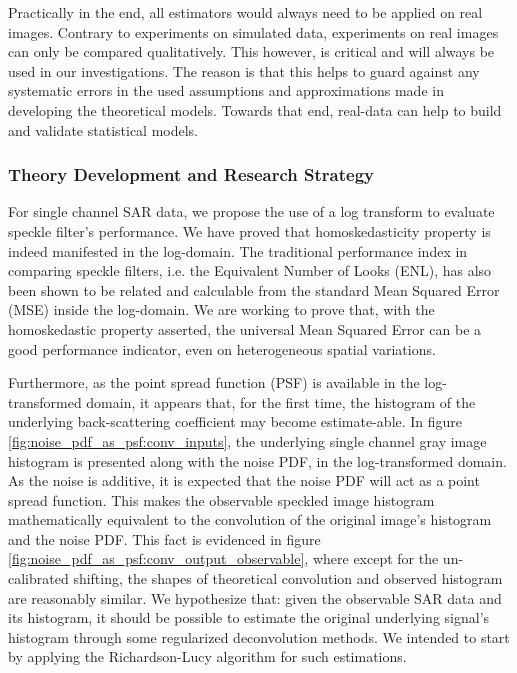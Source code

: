 Practically in the end, all estimators would always need to be applied on real images.
Contrary to experiments on simulated data, experiments on real images can only be compared qualitatively.
This however, is critical and will always be used in our investigations.
The reason is that this helps to guard against any systematic errors in the used assumptions and approximations made in developing the theoretical models.
Towards that end, real-data can help to build and validate statistical models.

\subsubsection{Theory Development and Research Strategy}
For single channel SAR data, we propose the use of a log transform to evaluate speckle filter's performance. 
We have proved that homoskedasticity property is indeed manifested in the log-domain.
The traditional performance index in comparing speckle filters, i.e. the Equivalent Number of Looks (ENL), has also been shown to be related and calculable from the standard Mean Squared Error (MSE) inside the log-domain.
We are working to prove that, with the homoskedastic property asserted, the universal Mean Squared Error can be a good performance indicator, even on heterogeneous spatial variations.

Furthermore, as the point spread function (PSF) is available in the log-transformed domain, it appears that, for the first time, the histogram of the underlying back-scattering coefficient may become estimate-able. 
In figure 
	\ref{fig:noise_pdf_as_psf:conv_inputs}, 
the underlying single channel gray image histogram is presented along with the noise PDF, in the log-transformed domain. 
As the noise is additive, it is expected that the noise PDF will act as a point spread function.
This makes the observable speckled image histogram mathematically equivalent to the convolution of the original image's histogram and the noise PDF.
This fact is evidenced in figure 
	\ref{fig:noise_pdf_as_psf:conv_output_observable}, 
where except for the un-calibrated shifting, the shapes of theoretical convolution and observed histogram are reasonably similar.
We hypothesize that: given the observable SAR data and its histogram, it should be possible to estimate the original underlying signal's histogram through some regularized deconvolution methods.
We intended to start by applying the Richardson-Lucy algorithm \cite{Richardson_1972_JOptSocAm, Lucy_1974_JAstronomical} for such estimations.

